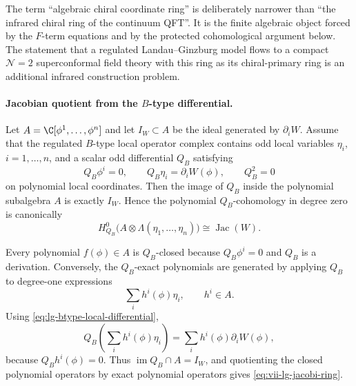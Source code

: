 The term ``algebraic chiral coordinate ring'' is deliberately narrower than
``the infrared chiral ring of the continuum QFT''.  It is the finite
algebraic object forced by the \(F\)-term equations and by the protected
cohomological argument below.  The statement that a regulated Landau--Ginzburg
model flows to a compact \(\mathcal N=2\) superconformal field theory with
this ring as its chiral-primary ring is an additional infrared construction
problem.

\paragraph{Jacobian quotient from the \(B\)-type differential.}
Let \(A=\C[\phi^1,\ldots,\phi^n]\) and let \(I_W\subset A\) be the ideal
generated by \(\partial_iW\).  Assume that the regulated \(B\)-type local
operator complex contains odd local variables \(\eta_i\), \(i=1,\ldots,n\),
and a scalar odd differential \(Q_B\) satisfying
\begin{equation}
  Q_B\phi^i=0,\qquad
  Q_B\eta_i=\partial_iW(\phi),
  \qquad
  Q_B^2=0
  \label{eq:lg-btype-local-differential}
\end{equation}
on polynomial local coordinates.  Then the image of \(Q_B\) inside the
polynomial subalgebra \(A\) is exactly \(I_W\).  Hence the polynomial
\(Q_B\)-cohomology in degree zero is canonically
\[
  H^0_{Q_B}\bigl(A\otimes\Lambda(\eta_1,\ldots,\eta_n)\bigr)
  \cong
  \operatorname{Jac}(W).
\]

Every polynomial \(f(\phi)\in A\) is \(Q_B\)-closed because
\(Q_B\phi^i=0\) and \(Q_B\) is a derivation.  Conversely, the \(Q_B\)-exact
polynomials are generated by applying \(Q_B\) to degree-one expressions
\[
  \sum_i h^i(\phi)\eta_i,\qquad h^i\in A.
\]
Using \eqref{eq:lg-btype-local-differential},
\[
  Q_B\left(\sum_i h^i(\phi)\eta_i\right)
  =
  \sum_i h^i(\phi)\partial_iW(\phi),
\]
because \(Q_Bh^i(\phi)=0\).  Thus
\(\operatorname{im}Q_B\cap A=I_W\), and quotienting the closed polynomial
operators by exact polynomial operators gives \eqref{eq:vii-lg-jacobi-ring}.


